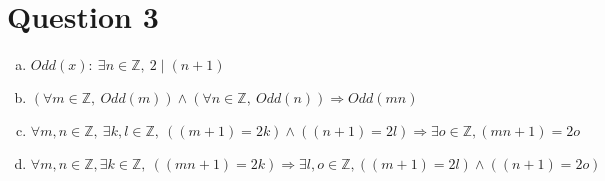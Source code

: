 \documentclass[12pt]{article}
\begin{document}
\section*{Question 3}

\begin{enumerate}[a)]
    \item
        $Odd(x):\: \exists n \in \mathbb{Z},\: 2 \mid (n+1)$
    \item
        $(\forall m \in \mathbb{Z},\:Odd(m))\land(\forall n \in \mathbb{Z},\:Odd(n)) \Rightarrow Odd(mn)$
    \item
        $\forall m,n \in \mathbb{Z},\:\exists k,l \in \mathbb{Z},\:((m+1)=2k)\land((n+1)=2l) \Rightarrow \exists o \in \mathbb{Z}, (mn+1)=2o$
    \item
        $\forall m,n \in \mathbb{Z}, \exists k \in \mathbb{Z},\:((mn+1)=2k) \Rightarrow \exists l,o \in \mathbb{Z}, ((m+1)=2l)\land((n+1)=2o)$

\end{enumerate}
\end{document}
